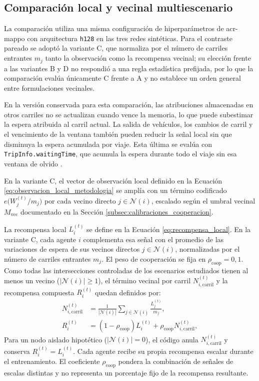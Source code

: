 \subsection{Comparación local y vecinal multiescenario}
\label{subsec:cooperacion_multiescenario}

La comparación utiliza una misma configuración de hiperparámetros de \acrshort{acr-mappo} con arquitectura \texttt{h128} en las tres redes sintéticas. Para el contraste pareado se adoptó la variante C, que normaliza por el número de carriles entrantes $m_j$ tanto la observación como la recompensa vecinal; su elección frente a las variantes B y D no respondió a una regla estadística prefijada, por lo que la comparación evalúa únicamente C frente a A y no establece un orden general entre formulaciones vecinales.

En la versión conservada para esta comparación, las atribuciones almacenadas en otros carriles no se actualizan cuando vence la memoria, lo que puede subestimar la espera atribuida al carril actual. La salida de vehículos, los cambios de carril y el vencimiento de la ventana también pueden reducir la señal local sin que disminuya la espera acumulada por viaje. Esta última se evalúa con \texttt{TripInfo.waitingTime}, que acumula la espera durante todo el viaje sin esa ventana de olvido \cite{SUMO2026_TripInfo}.

En la variante C, el vector de observación local definido en la Ecuación \eqref{eq:observacion_local_metodologia} se amplía con un término codificado $e\bigl(W_j^{(t)}/m_j\bigr)$ por cada vecino directo $j \in \mathcal{N}(i)$, escalado según el umbral vecinal $M_{\mathrm{vec}}$ documentado en la Sección \ref{subsec:calibraciones_cooperacion}.

La recompensa local $L_i^{(t)}$ se define en la Ecuación \eqref{eq:recompensa_local}. En la variante C, cada agente $i$ complementa esa señal con el promedio de las variaciones de espera de sus vecinos directos $j \in \mathcal{N}(i)$, normalizadas por el número de carriles entrantes $m_j$. El peso de cooperación se fija en $\rho_{\mathrm{coop}}=0{,}1$. Como todas las intersecciones controladas de los escenarios estudiados tienen al menos un vecino ($|\mathcal{N}(i)|\geq1$), el término vecinal por carril $N_{i,\mathrm{carril}}^{(t)}$ y la recompensa compuesta $R_i^{(t)}$ quedan definidos por:
\begin{align}
N_{i,\mathrm{carril}}^{(t)} &= \frac{1}{|\mathcal{N}(i)|} \sum_{j \in \mathcal{N}(i)} \frac{L_j^{(t)}}{m_j}, \label{eq:recompensa_vecinal} \\
R_i^{(t)} &= (1 - \rho_{\mathrm{coop}}) L_i^{(t)} + \rho_{\mathrm{coop}} N_{i,\mathrm{carril}}^{(t)}, \label{eq:recompensa_compuesta}
\end{align}
Para un nodo aislado hipotético ($|\mathcal{N}(i)|=0$), el código anula $N_{i,\mathrm{carril}}^{(t)}$ y conserva $R_i^{(t)}=L_i^{(t)}$. Cada agente recibe su propia recompensa escalar durante el entrenamiento. El coeficiente $\rho_{\mathrm{coop}}$ pondera la combinación de señales de escalas distintas y no representa un porcentaje fijo de la recompensa resultante.

